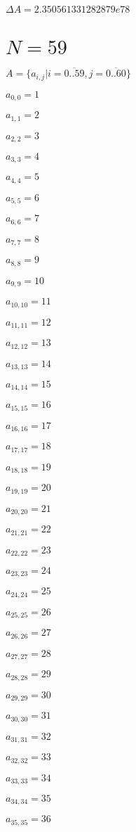 \documentclass[a4paper,12pt]{article}
\begin{document}
$\Delta A = 2.350561331282879e78$



\section{ $N = 59$ }
$A = \{ a _{ i, j } | i = \overline { 0..59 }, j = \overline { 0..60 } \}$

$a _{ 0, 0 } = 1$

$a _{ 1, 1 } = 2$

$a _{ 2, 2 } = 3$

$a _{ 3, 3 } = 4$

$a _{ 4, 4 } = 5$

$a _{ 5, 5 } = 6$

$a _{ 6, 6 } = 7$

$a _{ 7, 7 } = 8$

$a _{ 8, 8 } = 9$

$a _{ 9, 9 } = 10$

$a _{ 10, 10 } = 11$

$a _{ 11, 11 } = 12$

$a _{ 12, 12 } = 13$

$a _{ 13, 13 } = 14$

$a _{ 14, 14 } = 15$

$a _{ 15, 15 } = 16$

$a _{ 16, 16 } = 17$

$a _{ 17, 17 } = 18$

$a _{ 18, 18 } = 19$

$a _{ 19, 19 } = 20$

$a _{ 20, 20 } = 21$

$a _{ 21, 21 } = 22$

$a _{ 22, 22 } = 23$

$a _{ 23, 23 } = 24$

$a _{ 24, 24 } = 25$

$a _{ 25, 25 } = 26$

$a _{ 26, 26 } = 27$

$a _{ 27, 27 } = 28$

$a _{ 28, 28 } = 29$

$a _{ 29, 29 } = 30$

$a _{ 30, 30 } = 31$

$a _{ 31, 31 } = 32$

$a _{ 32, 32 } = 33$

$a _{ 33, 33 } = 34$

$a _{ 34, 34 } = 35$

$a _{ 35, 35 } = 36$
\end{document}
